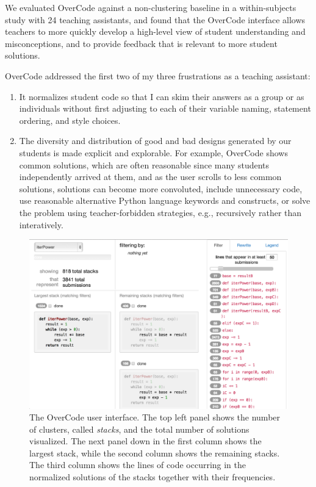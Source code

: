 We evaluated OverCode against a non-clustering baseline in a within-subjects study with 24 teaching assistants, and found that the OverCode interface allows teachers to more quickly develop a high-level view of student understanding and misconceptions, and to provide feedback that is relevant to more student solutions.

OverCode addressed the first two of my three frustrations as a teaching assistant:
\begin{enumerate}
\item It normalizes student code so that I can skim their answers as a group or as individuals without first adjusting to each of their variable naming, statement ordering, and style choices.
\item The diversity and distribution of good and bad designs generated by our students is made explicit and explorable. For example, OverCode shows common solutions, which are often reasonable since many students independently arrived at them, and as the user scrolls to less common solutions, solutions can become more convoluted, include unnecessary code, use reasonable alternative Python language keywords and constructs, or solve the problem using teacher-forbidden strategies, e.g., recursively rather than interatively.
\end{enumerate}

\begin{figure}
\centering
\includegraphics[width=1.0\linewidth]{Body/figures/interfaceScreenShot.png}
\caption{The OverCode user interface. The top left panel shows the number of clusters, called {\it stacks}, and the total number of solutions visualized. The next panel down in the first column shows the largest stack, while the second column shows the remaining stacks. The third column shows the lines of code occurring in the normalized solutions of the stacks together with their frequencies.}
\label{fullinterface}
\end{figure}


